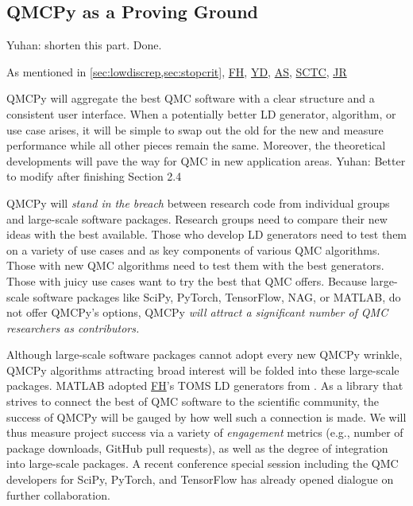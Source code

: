 \documentclass[11pt]{NSFamsart}
\newcommand{\cmtS}[1]{{\color{blue}{(Simon: #1)}}}
\newcommand{\FH}{\hyperlink{FHlink}{FH}\xspace}
\newcommand{\SCTC}{\hyperlink{SCTClink}{SCTC}\xspace}
\newcommand{\YD}{\hyperlink{YDlink}{YD}\xspace}
\newcommand{\JR}{\hyperlink{JRlink}{JR}\xspace}
\newcommand{\AS}{\hyperlink{ASlink}{AS}\xspace}
\newcommand{\SciPy}{SciPy\xspace}
\newcommand{\TensorFlow}{TensorFlow\xspace}
\newcommand{\NAG}{NAG\xspace}
\newcommand{\MATLAB}{MATLAB\xspace}
\newcommand{\PyTorch}{PyTorch\xspace}
\newcommand{\YDNote}[1]{{\color{magenta}Yuhan: #1}}
\begin{document}
\subsection{QMCPy as a Proving Ground} \label{sec:provingground}
\cmtS{Fred \& Yuhan: maybe shorten the writing below, and focus on QMCPy as a vessel for connecting our new methods (\& existing state-of-the-art) to scientific practitioners who will use such tools for cost-efficient solutions to cutting-edge scientific problems.} \YDNote{shorten this part. Done.}  

As mentioned in \cref{sec:lowdiscrep,sec:stopcrit}, \FH, \YD, \AS, \SCTC, \JR

QMCPy will aggregate the best QMC software with a clear structure and a consistent user interface.  When a potentially better LD generator, algorithm, or use case arises, it will be simple to swap out the old for the new and measure performance while all other pieces remain the same.  Moreover, the theoretical developments will pave the way for QMC in new application areas. \YDNote{Better to modify after finishing Section 2.4}

QMCPy will \emph{stand in the breach} between research code from individual groups and large-scale software packages.  Research groups need to compare their new ideas with the best available.  Those who develop LD generators need to test them on a variety of use cases and as key components of various QMC algorithms.  Those with new QMC algorithms need to test them with the best generators.  Those with juicy use cases want to try the best that QMC offers.  Because large-scale software packages like \SciPy, \PyTorch, \TensorFlow, \NAG, or \MATLAB, do not offer QMCPy's options,  QMCPy \emph{will attract a significant number of QMC researchers as contributors.}

Although large-scale software packages cannot adopt every new QMCPy wrinkle, QMCPy algorithms attracting broad interest will be folded into these large-scale packages. \MATLAB adopted \FH's TOMS LD generators from \cite{HonHic00a}. As a library that strives to connect the best of QMC software to the scientific community, the success of QMCPy will be gauged by how well such a connection is made. We will thus measure project success via a variety of \emph{engagement} metrics (e.g., number of package downloads, GitHub pull requests), as well as the degree of integration into large-scale packages.  A recent conference special session including the QMC developers for \SciPy, \PyTorch, and \TensorFlow has already opened dialogue on further collaboration.
\end{document}
